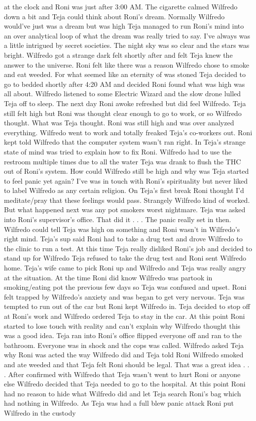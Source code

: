\documentclass[12pt]{book}
\begin{document}
at the clock and Roni was just after 3:00 AM. The cigarette calmed Wilfredo down a bit and Teja could think about Roni's dream. Normally Wilfredo would've just was a dream but was high Teja managed to run Roni's mind into an over analytical loop of what the dream was really tried to say. I've always was a little intrigued by secret societies. The night sky was so clear and the stars was bright. Wilfredo got a strange dark felt shortly after and felt Teja knew the answer to the universe. Roni felt like there was a reason Wilfredo chose to smoke and eat weeded. For what seemed like an eternity of was stoned Teja decided to go to bedded shortly after 4:20 AM and decided Roni found what was high was all about. Wilfredo listened to some Electric Wizard and the slow drone lulled Teja off to sleep. The next day Roni awoke refreshed but did feel Wilfredo. Teja still felt high but Roni was thought clear enough to go to work, or so Wilfredo thought. What was Teja thought. Roni was still high and was over analyzed everything. Wilfredo went to work and totally freaked Teja's co-workers out. Roni kept told Wilfredo that the computer system wasn't ran right. In Teja's strange state of mind was tried to explain how to fix Roni. Wilfredo had to use the restroom multiple times due to all the water Teja was drank to flush the THC out of Roni's system. How could Wilfredo still be high and why was Teja started to feel panic yet again? I've was in touch with Roni's spirituality but never liked to label Wilfredo as any certain religion. On Teja's first break Roni thought I'd meditate/pray that these feelings would pass. Strangely Wilfredo kind of worked. But what happened next was any pot smokers worst nightmare. Teja was asked into Roni's supervisor's office. That did it . . .  The panic really set in then. Wilfredo could tell Teja was high on something and Roni wasn't in Wilfredo's right mind. Teja's sup said Roni had to take a drug test and drove Wilfredo to the clinic to run a test. At this time Teja really disliked Roni's job and decided to stand up for Wilfredo Teja refused to take the drug test and Roni sent Wilfredo home. Teja's wife came to pick Roni up and Wilfredo and Teja was really angry at the situation. At the time Roni did know Wilfredo was partook in smoking/eating pot the previous few days so Teja was confused and upset. Roni felt trapped by Wilfredo's anxiety and was began to get very nervous. Teja was tempted to run out of the car but Roni kept Wilfredo in. Teja decided to stop off at Roni's work and Wilfredo ordered Teja to stay in the car. At this point Roni started to lose touch with reality and can't explain why Wilfredo thought this was a good idea. Teja ran into Roni's office flipped everyone off and ran to the bathroom. Everyone was in shock and the cops was called. Wilfredo asked Teja why Roni was acted the way Wilfredo did and Teja told Roni Wilfredo smoked and ate weeded and that Teja felt Roni should be legal. That was a great idea . . .  After confirmed with Wilfredo that Teja wasn't went to hurt Roni or anyone else Wilfredo decided that Teja needed to go to the hospital. At this point Roni had no reason to hide what Wilfredo did and let Teja search Roni's bag which had nothing in Wilfredo. As Teja was had a full blew panic attack Roni put Wilfredo in the custody 
\end{document}
